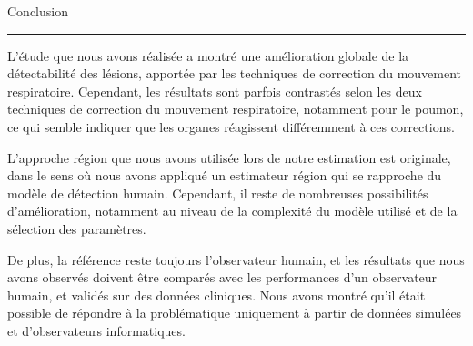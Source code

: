 

{\fontsize{30}{100}\selectfont Conclusion}


\rule{15cm}{0.1em}

\vspace{1cm}

\thispagestyle{plain}

L'étude que nous avons réalisée a montré une amélioration globale de la
détectabilité des lésions, apportée par les techniques de correction du
mouvement respiratoire. Cependant, les résultats sont parfois contrastés
selon les deux techniques de correction du mouvement respiratoire, notamment
pour le poumon, ce qui semble indiquer que les organes réagissent différemment à
ces corrections.

L'approche région que nous avons utilisée lors de notre estimation est
originale, dans le sens où nous avons appliqué un estimateur région qui se
rapproche du modèle de détection humain. Cependant, il reste de nombreuses
possibilités d'amélioration, notamment au niveau de la complexité du modèle
utilisé et de la sélection des paramètres. 

De plus, la référence reste toujours l'observateur humain, et les résultats que
nous avons observés doivent être comparés avec les performances d'un observateur
humain, et validés sur des données cliniques. Nous avons montré qu'il était
possible de répondre à la problématique uniquement à partir de données simulées
et d'observateurs informatiques.
